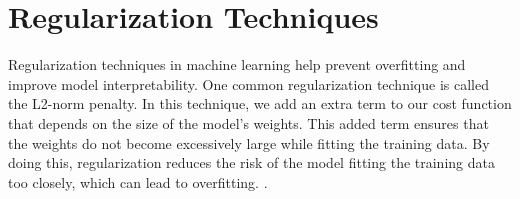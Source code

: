 \documentclass[a4paper, UKenglish, 11pt]{uiomaster}
\begin{document}
%
%
%
%
%
%
%


\section{Regularization Techniques}
Regularization techniques in machine learning help prevent overfitting and improve model interpretability. One common regularization technique is called the L2-norm penalty. In this technique, we add an extra term to our cost function that depends on the size of the model's weights. This added term ensures that the weights do not become excessively large while fitting the training data. By doing this, regularization reduces the risk of the model fitting the training data too closely, which can lead to overfitting. \cite{Hjorth-Jensen2022}.
\end{document}
